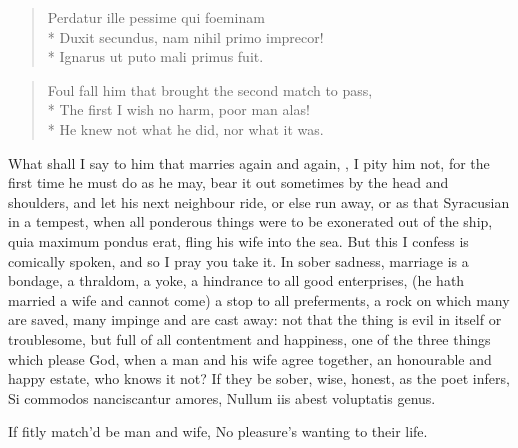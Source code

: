 {\begin{latin}
\begin{verse}
Perdatur ille pessime qui foeminam\\*
Duxit secundus, nam nihil primo imprecor!\\*
Ignarus ut puto mali primus fuit.
\end{verse}
\end{latin}

\begin{verse}
Foul fall him that brought the second match to pass,\\*
The first I wish no harm, poor man alas!\\*
He knew not what he did, nor what it was.
\end{verse}

What shall I say to him that marries again and again, , I pity him not, for the first time
he must do as he may, bear it out sometimes by the head and shoulders,
and let his next neighbour ride, or else run away, or as that
Syracusian in a tempest, when all ponderous things were to be
exonerated out of the ship, quia maximum pondus erat, fling his wife
into the sea. But this I confess is comically spoken, and so I
pray you take it. In sober sadness, marriage is a bondage, a
thraldom, a yoke, a hindrance to all good enterprises, (he hath married
a wife and cannot come) a stop to all preferments, a rock on which many
are saved, many impinge and are cast away: not that the thing is evil
in itself or troublesome, but full of all contentment and happiness,
one of the three things which please God,  when a man and his
wife agree together, an honourable and happy estate, who knows it not?
If they be sober, wise, honest, as the poet infers,
Si commodos nanciscantur amores,
Nullum iis abest voluptatis genus.

If fitly match'd be man and wife,
No pleasure's wanting to their life.

}
